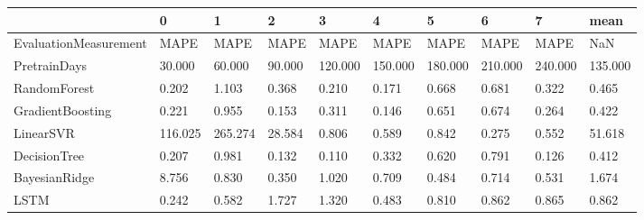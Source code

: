 \begin{tabular}{llllllllll}
\toprule
{} &       0 &       1 &      2 &       3 &       4 &       5 &       6 &       7 &    mean \\
\midrule
EvaluationMeasurement &    MAPE &    MAPE &   MAPE &    MAPE &    MAPE &    MAPE &    MAPE &    MAPE &     NaN \\
PretrainDays          &  30.000 &  60.000 & 90.000 & 120.000 & 150.000 & 180.000 & 210.000 & 240.000 & 135.000 \\
RandomForest          &   0.202 &   1.103 &  0.368 &   0.210 &   0.171 &   0.668 &   0.681 &   0.322 &   0.465 \\
GradientBoosting      &   0.221 &   0.955 &  0.153 &   0.311 &   0.146 &   0.651 &   0.674 &   0.264 &   0.422 \\
LinearSVR             & 116.025 & 265.274 & 28.584 &   0.806 &   0.589 &   0.842 &   0.275 &   0.552 &  51.618 \\
DecisionTree          &   0.207 &   0.981 &  0.132 &   0.110 &   0.332 &   0.620 &   0.791 &   0.126 &   0.412 \\
BayesianRidge         &   8.756 &   0.830 &  0.350 &   1.020 &   0.709 &   0.484 &   0.714 &   0.531 &   1.674 \\
LSTM                  &   0.242 &   0.582 &  1.727 &   1.320 &   0.483 &   0.810 &   0.862 &   0.865 &   0.862 \\
\bottomrule
\end{tabular}

